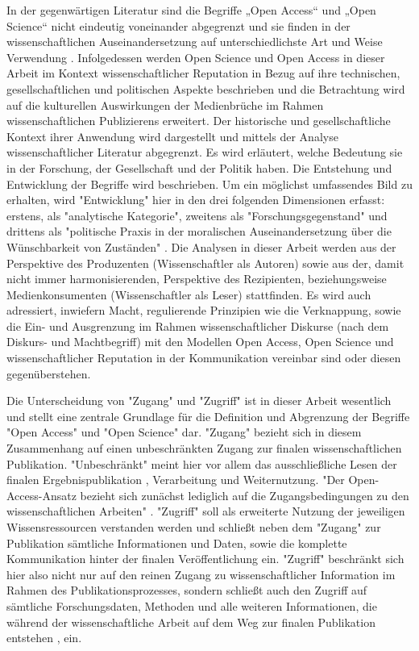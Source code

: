 In der gegenwärtigen Literatur sind die Begriffe „Open Access“ und „Open Science“ nicht eindeutig voneinander abgegrenzt und sie finden in der wissenschaftlichen Auseinandersetzung auf unterschiedlichste Art und Weise Verwendung \cite{cite:9}. Infolgedessen werden Open Science und Open Access in dieser Arbeit im Kontext wissenschaftlicher Reputation in Bezug auf ihre technischen, gesellschaftlichen und politischen Aspekte beschrieben und die Betrachtung wird auf die kulturellen Auswirkungen der Medienbrüche im Rahmen wissenschaftlichen Publizierens erweitert. Der historische und gesellschaftliche Kontext ihrer Anwendung wird dargestellt und mittels der Analyse wissenschaftlicher Literatur abgegrenzt. Es wird erläutert, welche Bedeutung sie in der Forschung, der Gesellschaft und der Politik haben. Die Entstehung und Entwicklung der Begriffe wird beschrieben. Um ein möglichst umfassendes Bild zu erhalten, wird "Entwicklung" hier in den drei folgenden Dimensionen erfasst: erstens, als "analytische Kategorie", zweitens als "Forschungsgegenstand" und drittens als "politische Praxis in der moralischen Auseinandersetzung über die Wünschbarkeit von Zuständen" \cite{cite:10}. Die Analysen in dieser Arbeit werden aus der Perspektive des Produzenten (Wissenschaftler als Autoren) sowie aus der, damit nicht immer harmonisierenden, Perspektive des Rezipienten, beziehungsweise Medienkonsumenten (Wissenschaftler als Leser) stattfinden. Es wird auch adressiert, inwiefern Macht, regulierende Prinzipien wie die Verknappung, sowie die Ein- und Ausgrenzung im Rahmen wissenschaftlicher Diskurse (nach dem Diskurs- und Machtbegriff) mit den Modellen Open Access, Open Science und wissenschaftlicher Reputation in der Kommunikation vereinbar sind oder diesen gegenüberstehen.

Die Unterscheidung von "Zugang" und "Zugriff" ist in dieser Arbeit wesentlich und stellt eine zentrale Grundlage für die Definition und Abgrenzung der Begriffe "Open Access" und "Open Science" dar. "Zugang" bezieht sich in diesem Zusammenhang auf einen unbeschränkten Zugang zur finalen wissenschaftlichen Publikation. "Unbeschränkt" meint hier vor allem das ausschließliche Lesen der finalen Ergebnispublikation \cite{cite:9a}, Verarbeitung und Weiternutzung. "Der Open-Access-Ansatz bezieht sich zunächst lediglich auf die Zugangsbedingungen zu den wissenschaftlichen Arbeiten" \cite{muller_2010_open}. "Zugriff" soll als erweiterte Nutzung der jeweiligen Wissensressourcen verstanden werden und schließt neben dem "Zugang" zur Publikation sämtliche Informationen und Daten, sowie die komplette Kommunikation hinter der finalen Veröffentlichung \cite{cite:9b} ein. "Zugriff" beschränkt sich hier also nicht nur auf den reinen Zugang zu wissenschaftlicher Information im Rahmen des Publikationsprozesses, sondern schließt auch den Zugriff auf sämtliche Forschungsdaten, Methoden und alle weiteren Informationen, die während der wissenschaftliche Arbeit auf dem Weg zur finalen Publikation entstehen \cite{cite:9c}, ein.

